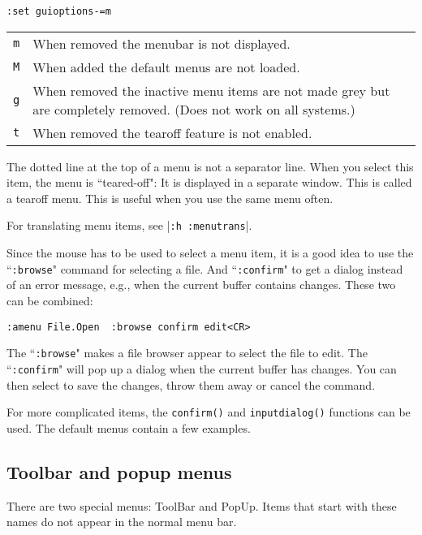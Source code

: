 \begin{Verbatim}[samepage=true]
 :set guioptions-=m
\end{Verbatim}

\begin{center} \begin{tabularx} {0.75\textwidth} {l X}
				\texttt{m} & When removed the menubar is not displayed. \\
				\texttt{M} & When added the default menus are not loaded. \\
				\texttt{g} & When removed the inactive menu items are not made grey but are completely removed.  (Does not work on all systems.) \\
				\texttt{t} & When removed the tearoff feature is not enabled. \\
\end{tabularx} \end{center}

The dotted line at the top of a menu is not a separator line.
When you select this item, the menu is ``teared-off": It is displayed in a separate window.
This is called a tearoff menu.
This is useful when you use the same menu often.

For translating menu items, see |\texttt{:h :menutrans}|.

Since the mouse has to be used to select a menu item, it is a good idea to use the ``\texttt{:browse}" command for selecting a file.
And ``\texttt{:confirm}" to get a dialog instead of an error message, e.g., when the current buffer contains changes.
These two can be combined:

\begin{Verbatim}[samepage=true]
 :amenu File.Open  :browse confirm edit<CR>
\end{Verbatim}

The ``\texttt{:browse}" makes a file browser appear to select the file to edit.
The ``\texttt{:confirm}" will pop up a dialog when the current buffer has changes.
You can then select to save the changes, throw them away or cancel the command.

For more complicated items, the \texttt{confirm()} and \texttt{inputdialog()} functions can be used.
The default menus contain a few examples.
\subsection{Toolbar and popup menus}
There are two special menus: ToolBar and PopUp.
Items that start with these names do not appear in the normal menu bar.

